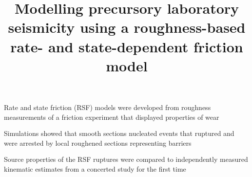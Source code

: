 \documentclass[draft]{agujournal2019}
\begin{document}
\title{Modelling precursory laboratory seismicity using a roughness-based rate- and state-dependent friction model}










\begin{keypoints}
\item Rate and state friction (RSF) models were developed from roughness measurements of a friction experiment that displayed properties of wear
\item Simulations showed that smooth sections nucleated events that ruptured and were arrested by local roughened sections representing barriers
\item Source properties of the RSF ruptures were compared to independently measured kinematic estimates from a concerted study for the first time
\end{keypoints}
\end{document}

